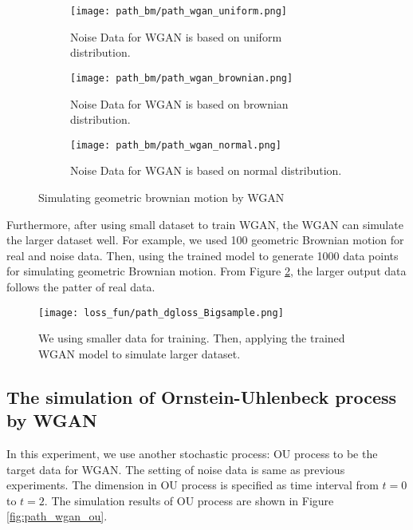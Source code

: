 \documentclass{article}
\begin{document}
	\begin{figure}[h]
		\centering
		\begin{subfigure}[b]{0.6\textwidth}
			\texttt{[image: path\_bm/path\_wgan\_uniform.png]}
			\caption{Noise Data for WGAN is based on uniform distribution.}
		\end{subfigure}
		\begin{subfigure}[b]{0.6\textwidth}
			\texttt{[image: path\_bm/path\_wgan\_brownian.png]}
			\caption{Noise Data for WGAN is based on brownian distribution.}
		\end{subfigure}
		\begin{subfigure}[b]{0.6\textwidth}
			\texttt{[image: path\_bm/path\_wgan\_normal.png]}
			\caption{Noise Data for WGAN is based on normal distribution.}
		\end{subfigure}
		\caption{Simulating geometric brownian motion by WGAN}
		\label{fig:path_wgan_bm}
	\end{figure}
	
	Furthermore, after using small dataset to train WGAN, the WGAN can simulate the larger dataset well.
	For example, we used 100 geometric Brownian motion for real and noise data. Then, using the trained model to generate 1000 data points for simulating geometric Brownian motion.
	From Figure \ref{fig:path_dgloss_Bigsample}, the larger output data follows the patter of real data.
	
	
	\begin{figure}[h]
		\centering
		\texttt{[image: loss\_fun/path\_dgloss\_Bigsample.png]}
		\caption{We using smaller data for training. Then, applying the trained WGAN model to simulate larger dataset.}
		\label{fig:path_dgloss_Bigsample}
	\end{figure}
	
	

	
	

	\subsection{The simulation of Ornstein-Uhlenbeck process by WGAN}
	
	In this experiment, we use another stochastic process: OU process to be the target data for WGAN.
	The setting of noise data is same as previous experiments.
	The dimension in OU process is specified as time interval from $t=0$ to $t=2$. 
	The simulation results of OU process are shown in Figure \ref{fig:path_wgan_ou}. 
	
\end{document}
